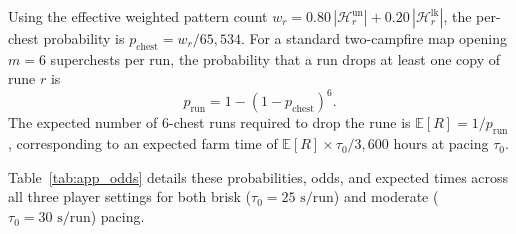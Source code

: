 \documentclass[11pt,reqno]{amsart}
\theoremstyle{definition}
\begin{document}
Using the effective weighted pattern count $w_r = 0.80\,|\mathcal{H}_r^{\text{un}}| + 0.20\,|\mathcal{H}_r^{\text{lk}}|$, the per-chest probability is $p_{\text{chest}} = w_r / 65{,}534$. For a standard two-campfire map opening $m = 6$ superchests per run, the probability that a run drops at least one copy of rune $r$ is
\begin{equation}
    p_{\text{run}} = 1 - (1 - p_{\text{chest}})^6.
\end{equation}
The expected number of $6$-chest runs required to drop the rune is $\mathbb{E}[R] = 1 / p_{\text{run}}$, corresponding to an expected farm time of $\mathbb{E}[R] \times \tau_0 / 3{,}600\text{ hours}$ at pacing $\tau_0$.

Table~\ref{tab:app_odds} details these probabilities, odds, and expected times across all three player settings for both brisk ($\tau_0 = 25\text{ s/run}$) and moderate ($\tau_0 = 30\text{ s/run}$) pacing.
\end{document}
